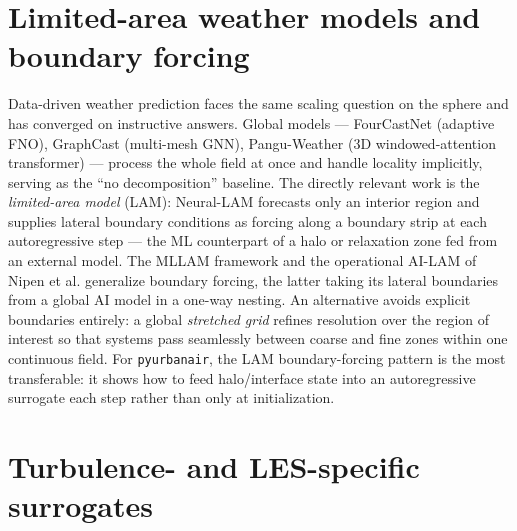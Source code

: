 \documentclass[11pt]{article}
\begin{document}
\section{Limited-area weather models and boundary forcing}

Data-driven weather prediction faces the same scaling question on the sphere and
has converged on instructive answers. Global models --- FourCastNet
\cite{pathak2022fourcastnet} (adaptive FNO), GraphCast \cite{lam2023graphcast}
(multi-mesh GNN), Pangu-Weather \cite{bi2023pangu} (3D windowed-attention
transformer) --- process the whole field at once and handle locality implicitly,
serving as the ``no decomposition'' baseline. The directly relevant work is the
\emph{limited-area model} (LAM): Neural-LAM \cite{oskarsson2023neurallam}
forecasts only an interior region and supplies lateral boundary conditions as
forcing along a boundary strip at each autoregressive step --- the ML counterpart
of a halo or relaxation zone fed from an external model. The MLLAM framework
\cite{oskarsson2025mllam} and the operational AI-LAM of Nipen et al.
\cite{nipen2025ailam} generalize boundary forcing, the latter taking its lateral
boundaries from a global AI model in a one-way nesting. An alternative avoids
explicit boundaries entirely: a global \emph{stretched grid}
\cite{husain2024stretchedgrid} refines resolution over the region of interest so
that systems pass seamlessly between coarse and fine zones within one continuous
field. For \texttt{pyurbanair}, the LAM boundary-forcing pattern is the most
transferable: it shows how to feed halo/interface state into an autoregressive
surrogate each step rather than only at initialization.

\section{Turbulence- and LES-specific surrogates}
\end{document}
